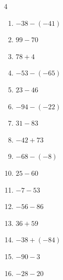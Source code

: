 \begin{multicols}{4}
\begin{enumerate}
        \phantom{$=97$}

  \item $-38-(-41)$

        \phantom{$=3$}

  \item $99-70$

        \phantom{$=29$}

  \item $78+4$

        \phantom{$=82$}

  \item $-53-(-65)$

        \phantom{$=12$}

  \item $23-46$

        \phantom{$=-23$}

  \item $-94-(-22)$

        \phantom{$=-72$}

  \item $31-83$

        \phantom{$=-52$}

  \item $-42+73$

        \phantom{$=31$}

  \item $-68-(-8)$

        \phantom{$=-60$}

  \item $25-60$

        \phantom{$=-35$}

  \item $-7-53$

        \phantom{$=-60$}

  \item $-56-86$

        \phantom{$=-142$}

\columnbreak %

  \item $36+59$

        \phantom{$=95$}

  \item $-38+(-84)$

        \phantom{$=-122$}

  \item $-90-3$

        \phantom{$=-93$}

  \item $-28-20$


\end{enumerate}
\end{multicols}
